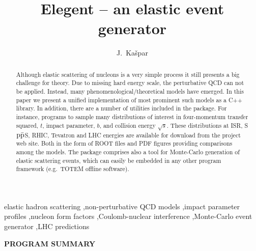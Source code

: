 \documentclass[preprint,12pt]{elsarticle}
\begin{document}
\begin{frontmatter}

\title{Elegent -- an elastic event generator}

\author{J.~Ka\v spar}
\address{CERN, 1211 Geneve 23, Switzerland}



\begin{abstract}
Although elastic scattering of nucleons is a very simple process it still presents a big challenge for theory. Due to missing hard energy scale, the perturbative QCD can not be applied. Instead, many phenomenological/theoretical models have emerged. In this paper we present a unified implementation of most prominent such models as a C++ library. In addition, there are a number of utilities included in the package. For instance, programs to sample many distributions of interest in four-momentum transfer squared, $t$, impact parameter, $b$, and collision energy $\sqrt s$. These distributions at ISR, S$\rm p\bar p$S, RHIC, Tevatron and LHC energies are available for download from the project web site. Both in the form of ROOT files and PDF figures providing comparisons among the models. The package comprises also a tool for Monte-Carlo generation of elastic scattering events, which can easily be embedded in any other program framework (e.g.~TOTEM offline software).
\end{abstract}

\begin{keyword}
elastic hadron scattering \sep non-perturbative QCD models \sep impact parameter profiles \sep nucleon form factors \sep Coulomb-nuclear interference \sep Monte-Carlo event generator \sep LHC predictions

\end{keyword}

\end{frontmatter}



\newpage

\noindent
{\bf PROGRAM SUMMARY}
\end{document}
